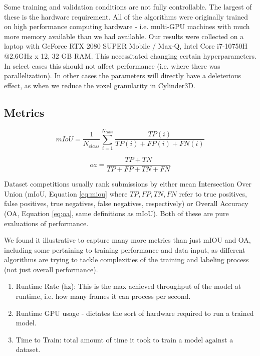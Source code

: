 Some training and validation conditions are not fully controllable. The largest of these is the hardware requirement. All of the algorithms were originally trained on high performance computing hardware - i.e. multi-GPU machines with much more memory available than we had available. Our results were collected on a laptop with GeForce RTX 2080 SUPER Mobile / Max-Q, Intel Core i7-10750H @2.6GHz x 12, 32 GB RAM. This necessitated changing certain hyperparameters. In select cases this should not affect performance (i.e. where there was parallelization). In other cases the parameters will directly have a deleterious effect, as when we reduce the voxel granularity in Cylinder3D.

\subsection{Metrics}
\label{sec:metrics}

\begin{equation}
  \label{eq:miou}
  mIoU = \frac{1}{N_{class}}\sum_{i=1}^{N_{class}} \frac{TP(i)}{TP(i) + FP(i) + FN(i)}
\end{equation}

\begin{equation}
  \label{eq:oa}
  oa = \frac{TP + TN}{TP + FP + TN + FN}
\end{equation}

Dataset competitions usually rank submissions by either mean Intersection Over Union (mIoU, Equation \ref{eq:miou} where $TP,FP,TN,FN$ refer to true positives, false positives, true negatives, false negatives, respectively) or Overall Accuracy (OA, Equation \ref{eq:oa}, same definitions as mIoU). Both of these are pure evaluations of performance.

We found it illustrative to capture many more metrics than just mIOU and OA, including some pertaining to training performance and data input, as different algorithms are trying to tackle complexities of the training and labeling process (not just overall performance).

\begin{enumerate}
  \item Runtime Rate (hz): This is the max achieved throughput of the model at runtime, i.e. how many frames it can process per second.
  \item Runtime GPU usage - dictates the sort of hardware required to run a trained model.
  \item Time to Train: total amount of time it took to train a model against a dataset.
\end{enumerate}

